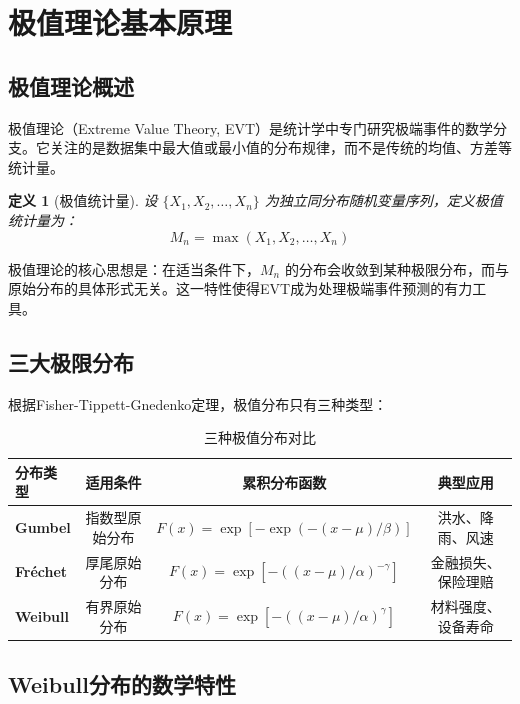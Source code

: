 \documentclass[12pt,a4paper]{ctexart}
\theoremstyle{cumcm}
\newtheorem{definition}{定义}[section]
\begin{document}
\section{极值理论基本原理}

\subsection{极值理论概述}

极值理论（Extreme Value Theory, EVT）是统计学中专门研究极端事件的数学分支。它关注的是数据集中最大值或最小值的分布规律，而不是传统的均值、方差等统计量。

\begin{definition}[极值统计量]
设 $\{X_1, X_2, \ldots, X_n\}$ 为独立同分布随机变量序列，定义极值统计量为：
\begin{equation}
M_n = \max(X_1, X_2, \ldots, X_n)
\end{equation}
\end{definition}

极值理论的核心思想是：在适当条件下，$M_n$ 的分布会收敛到某种极限分布，而与原始分布的具体形式无关。这一特性使得EVT成为处理极端事件预测的有力工具。

\subsection{三大极限分布}

根据Fisher-Tippett-Gnedenko定理，极值分布只有三种类型：

\begin{table}[H]
\centering
{}
\caption{三种极值分布对比}
\begin{tabular}{lccc}
\toprule
\textbf{分布类型} & \textbf{适用条件} & \textbf{累积分布函数} & \textbf{典型应用} \\
\midrule
\textbf{Gumbel} & 指数型原始分布 & $F(x) = \exp[-\exp(-(x-\mu)/\beta)]$ & 洪水、降雨、风速 \\
\textbf{Fréchet} & 厚尾原始分布 & $F(x) = \exp[-((x-\mu)/\alpha)^{-\gamma}]$ & 金融损失、保险理赔 \\
\textbf{Weibull} & 有界原始分布 & $F(x) = \exp[-((x-\mu)/\alpha)^{\gamma}]$ & 材料强度、设备寿命 \\
\bottomrule
\end{tabular}
\end{table}

\subsection{Weibull分布的数学特性}
\end{document}
